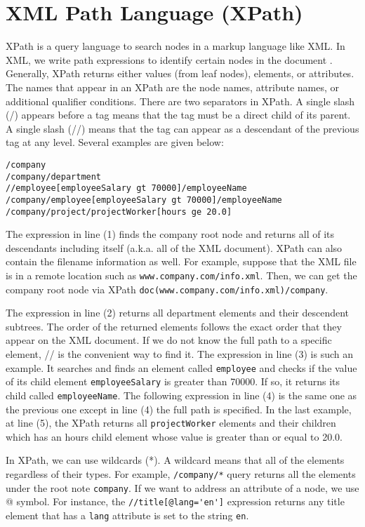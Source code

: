 \chapter{XML Path Language (XPath)}
\label{ch:appendix-xpath}
XPath is a query language to search nodes in a markup language like XML. In XML, we write path expressions to identify certain nodes in the document \autocite{elmasri2014}. Generally, XPath returns either values (from leaf nodes), elements, or attributes. The names that appear in an XPath are the node names, attribute names, or additional qualifier conditions. There are two separators in XPath. A single slash (/) appears before a tag means that the tag must be a direct child of its parent. A single slash (//) means that the tag can appear as a descendant of the previous tag at any level. Several examples are given below:

\begin{lstlisting}[language={},caption={Several examples of XPath from Elmasri et al..}]
/company
/company/department
//employee[employeeSalary gt 70000]/employeeName
/company/employee[employeeSalary gt 70000]/employeeName
/company/project/projectWorker[hours ge 20.0]
\end{lstlisting}

The expression in line (1) finds the company root node and returns all of its descendants including itself (a.k.a. all of the XML document). XPath can also contain the filename information as well. For example, suppose that the XML file is in a remote location such as \lstinline[language={}]!www.company.com/info.xml!. Then, we can get the company root node via XPath \lstinline[language={}]!doc(www.company.com/info.xml)/company!.

The expression in line (2) returns all department elements and their descendent subtrees. The order of the returned elements follows the exact order that they appear on the XML document. If we do not know the full path to a specific element, // is the convenient way to find it. The expression in line (3) is such an example. It searches and finds an element called \lstinline[language={}]!employee! and checks if the value of its child element \lstinline[language={}]!employeeSalary! is greater than 70000. If so, it returns its child called \lstinline[language={}]!employeeName!. The following expression in line (4) is the same one as the previous one except in line (4) the full path is specified. In the last example, at line (5),  the XPath returns all \lstinline[language={}]!projectWorker! elements and their children which has an hours child element whose value is greater than or equal to 20.0.

In XPath, we can use wildcards (*). A wildcard means that all of the elements regardless of their types. For example, \lstinline[language={}]!/company/*! query returns all the elements under the root note \lstinline[language={}]!company!. If we want to address an attribute of a node, we use @ symbol. For instance, the \lstinline[language={}]!//title[@lang='en']! expression returns any title element that has a \lstinline[language={}]!lang! attribute is set to the string \lstinline[language={}]!en!.